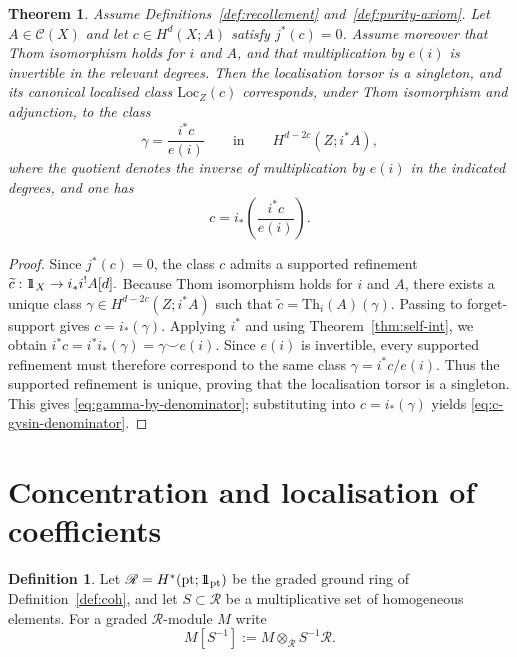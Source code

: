 \documentclass[10pt,a4paper,dvipsnames,x11names]{amsart}
\newcommand{\one}{1\hskip-3.5pt1}
\newcommand{\C}{\mathcal C}
\newcommand{\pt}{\mathrm{pt}}
\newcommand{\Th}{\mathrm{Th}}
\newcommand{\Loc}{\mathrm{Loc}}
\numberwithin{equation}{section}
\theoremstyle{plain}
\newtheorem{theorem}{Theorem}[section]
\theoremstyle{definition}
\newtheorem{definition}[definition]{Definition}
\theoremstyle{remark}
\begin{document}
\begin{theorem} \label{thm:Loc-by-euler}
Assume Definitions~\ref{def:recollement} and~\ref{def:purity-axiom}. Let $A\in\C(X)$ and let $c\in H^d(X;A)$ satisfy $j^*(c)=0$. Assume moreover that Thom isomorphism holds for $i$ and $A$, and that multiplication by $e(i)$ is invertible in the relevant degrees. Then the localisation torsor is a singleton, and its canonical localised class $\Loc_Z(c)$ corresponds, under Thom isomorphism and adjunction, to the class
\begin{equation}\label{eq:gamma-by-denominator}
\gamma=\frac{i^*c}{e(i)}
\qquad\text{in}\qquad
H^{d-2c}(Z;i^*A),
\end{equation}
where the quotient denotes the inverse of multiplication by $e(i)$ in the indicated degrees, and one has
\begin{equation}\label{eq:c-gysin-denominator}
c=i_*\!\left(\frac{i^*c}{e(i)}\right).
\end{equation}
\end{theorem}

\begin{proof}
Since $j^*(c)=0$, the class $c$ admits a supported refinement
$
\widetilde c:\one_X\to i_*i^!A[d].
$
Because Thom isomorphism holds for $i$ and $A$, there exists a unique class
$
\gamma\in H^{d-2c}(Z;i^*A)
$
such that
$
\widetilde c=\Th_i(A)(\gamma).
$
Passing to forget-support gives
$
c=i_*(\gamma).
$
Applying $i^*$ and using Theorem~\ref{thm:self-int}, we obtain
$
i^*c=i^*i_*(\gamma)=\gamma\smile e(i).
$
Since $e(i)$ is invertible, every supported refinement must therefore correspond to the same class
$
\gamma=i^*c/e(i).
$
Thus the supported refinement is unique, proving that the localisation torsor is a singleton. This gives \eqref{eq:gamma-by-denominator}; substituting into $c=i_*(\gamma)$ yields \eqref{eq:c-gysin-denominator}.
\end{proof}
\section{Concentration and localisation of coefficients}\label{sec:concentration}

\begin{definition} \label{def:loc}
Let $\mathscr R=H^*(\pt;\one_{\pt})$ be the graded ground ring of Definition~\ref{def:coh}, and let $S\subset\mathscr R$ be a multiplicative set of homogeneous elements.  For a graded $\mathscr R$-module $M$ write
\[
M[S^{-1}]:=M\otimes_{\mathscr R}S^{-1}\mathscr R.
\]
\end{definition}
\end{document}
